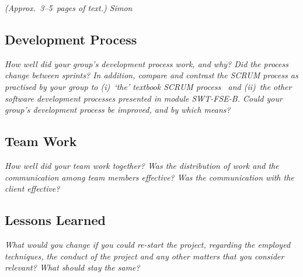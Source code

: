 \emph{(Approx.~3--5~pages of text.) Simon}

\subsection{Development Process}
\emph{How well did your group's development process work, and why? Did the 
process change between sprints?  In addition, compare and contrast the SCRUM 
process as practised by your group to (i)~`the' textbook SCRUM 
process~\cite{scrumbook} and (ii)~the other software development processes 
presented in module SWT-FSE-B.  Could your group's development process 
be improved, and by which means?}

\subsection{Team Work}
\emph{How well did your team work together?  Was the distribution of work and the communication among team members effective? Was the communication with the client effective?}

\subsection{Lessons Learned}
\emph{What would you change if you could re-start the project, regarding the employed techniques, the conduct of the project and any other matters that you consider relevant?  What should stay the same?}
